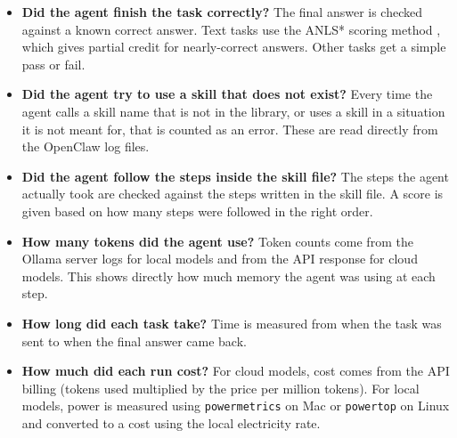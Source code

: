 \begin{itemize}
    \item \textbf{Did the agent finish the task correctly?} The final answer is checked against a known correct answer. Text tasks use the ANLS* scoring method \cite{anlsstar_2024}, which gives partial credit for nearly-correct answers. Other tasks get a simple pass or fail.

    \item \textbf{Did the agent try to use a skill that does not exist?} Every time the agent calls a skill name that is not in the library, or uses a skill in a situation it is not meant for, that is counted as an error. These are read directly from the OpenClaw log files.

    \item \textbf{Did the agent follow the steps inside the skill file?} The steps the agent actually took are checked against the steps written in the skill file. A score is given based on how many steps were followed in the right order.

    \item \textbf{How many tokens did the agent use?} Token counts come from the Ollama server logs for local models and from the API response for cloud models. This shows directly how much memory the agent was using at each step.

    \item \textbf{How long did each task take?} Time is measured from when the task was sent to when the final answer came back.

    \item \textbf{How much did each run cost?} For cloud models, cost comes from the API billing (tokens used multiplied by the price per million tokens). For local models, power is measured using \texttt{powermetrics} on Mac or \texttt{powertop} on Linux \cite{tokenpowerbench_2024} and converted to a cost using the local electricity rate.
\end{itemize}
